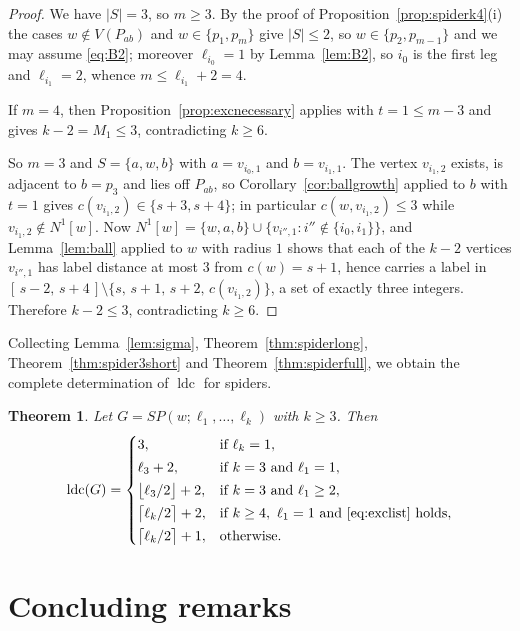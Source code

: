 \documentclass[reqno,10pt]{article}
\newtheorem{theorem}{Theorem}
\theoremstyle{definition}
\numberwithin{equation}{section}
\numberwithin{theorem}{section}
\newcommand{\ldc}{\operatorname{ldc}}
\newcommand{\Ball}[2]{N^{#2}[#1]}
\newcommand{\Ntwo}{M}
\begin{document}
\begin{proof}
We have $|S|=3$, so $m\ge3$. By the proof of
Proposition~\ref{prop:spiderk4}(i) the cases $w\notin V(P_{ab})$ and
$w\in\{p_1,p_m\}$ give $|S|\le2$, so $w\in\{p_2,p_{m-1}\}$ and we may assume
\eqref{eq:B2}; moreover $\ell_{i_0}=1$ by Lemma~\ref{lem:B2}, so $i_0$ is the
first leg and $\ell_{i_1}=2$, whence $m\le \ell_{i_1}+2=4$.

If $m=4$, then Proposition~\ref{prop:excnecessary} applies with $t=1\le m-3$ and
gives $k-2=\Ntwo_1\le3$, contradicting $k\ge6$.

So $m=3$ and $S=\{a,w,b\}$ with $a=v_{i_0,1}$ and $b=v_{i_1,1}$. The vertex
$v_{i_1,2}$ exists, is adjacent to $b=p_3$ and lies off $P_{ab}$, so
Corollary~\ref{cor:ballgrowth} applied to $b$ with $t=1$ gives
$c(v_{i_1,2})\in\{s+3,s+4\}$; in particular $c(w,v_{i_1,2})\le3$ while
$v_{i_1,2}\notin\Ball{w}{1}$. Now
$\Ball{w}{1}=\{w,a,b\}\cup\{v_{i'',1}:i''\notin\{i_0,i_1\}\}$, and
Lemma~\ref{lem:ball} applied to $w$ with radius $1$ shows that each of the
$k-2$ vertices $v_{i'',1}$ has label distance at most $3$ from $c(w)=s+1$, hence
carries a label in
$[\,s-2,\,s+4\,]\setminus\{s,\,s+1,\,s+2,\,c(v_{i_1,2})\}$, a set of exactly
three integers. Therefore $k-2\le3$, contradicting $k\ge6$.
\end{proof}

Collecting Lemma~\ref{lem:sigma}, Theorem~\ref{thm:spiderlong},
Theorem~\ref{thm:spider3short} and Theorem~\ref{thm:spiderfull}, we obtain the
complete determination of $\ldc$ for spiders.

\begin{theorem}
\label{thm:spidersummary}
Let $G=SP(w;\ell_1,\dots,\ell_k)$ with $k\ge3$. Then
\[
  \ldc(G)=
  \begin{cases}
    3, & \text{if } \ell_k=1,\\[2pt]
    \ell_3+2, & \text{if } k=3 \text{ and } \ell_1=1,\\[2pt]
    \bigl\lfloor \ell_3/2\bigr\rfloor+2, & \text{if } k=3 \text{ and } \ell_1\ge2,\\[2pt]
    \bigl\lceil \ell_k/2\bigr\rceil+2, & \text{if } k\ge4,\ \ell_1=1
      \text{ and \eqref{eq:exclist} holds},\\[2pt]
    \bigl\lceil \ell_k/2\bigr\rceil+1, & \text{otherwise.}
  \end{cases}
\]
\end{theorem}

\section{Concluding remarks}
\label{sec:conclusion}
\end{document}

